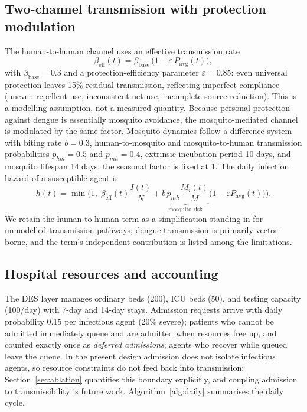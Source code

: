 \documentclass[]{interact}
\begin{document}
\subsection{Two-channel transmission with protection modulation}

The human-to-human channel uses an effective transmission rate
\begin{equation}
\beta_{\mathrm{eff}}(t) = \beta_{\mathrm{base}}\,\big(1 - \varepsilon\, P_{\mathrm{avg}}(t)\big),
\label{eq:beta}
\end{equation}
with $\beta_{\mathrm{base}}{=}0.3$ and a protection-efficiency parameter $\varepsilon{=}0.85$: even universal protection leaves 15\% residual transmission, reflecting imperfect compliance (uneven repellent use, inconsistent net use, incomplete source reduction). This is a modelling assumption, not a measured quantity. Because personal protection against dengue is essentially mosquito avoidance, the mosquito-mediated channel is modulated by the same factor. Mosquito dynamics follow a difference system with biting rate $b{=}0.3$, human-to-mosquito and mosquito-to-human transmission probabilities $p_{hm}{=}0.5$ and $p_{mh}{=}0.4$, extrinsic incubation period 10 days, and mosquito lifespan 14 days; the seasonal factor is fixed at 1. The daily infection hazard of a susceptible agent is
\begin{equation}
h(t) = \min\!\Big(1,\; \beta_{\mathrm{eff}}(t)\frac{I(t)}{N} + \underbrace{b\,p_{mh}\frac{M_i(t)}{M}}_{\text{mosquito risk}}\big(1-\varepsilon P_{\mathrm{avg}}(t)\big)\Big).
\label{eq:hazard}
\end{equation}
We retain the human-to-human term as a simplification standing in for unmodelled transmission pathways; dengue transmission is primarily vector-borne, and the term's independent contribution is listed among the limitations.

\subsection{Hospital resources and accounting}\label{sec:des}

The DES layer manages ordinary beds (200), ICU beds (50), and testing capacity (100/day) with 7-day and 14-day stays. Admission requests arrive with daily probability 0.15 per infectious agent (20\% severe); patients who cannot be admitted immediately queue and are admitted when resources free up, and counted exactly once as \emph{deferred admissions}; agents who recover while queued leave the queue. In the present design admission does not isolate infectious agents, so resource constraints do not feed back into transmission; Section~\ref{sec:ablation} quantifies this boundary explicitly, and coupling admission to transmissibility is future work. Algorithm~\ref{alg:daily} summarises the daily cycle.
\end{document}
